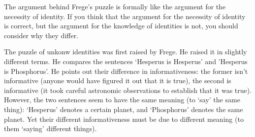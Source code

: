 \documentclass[../../../include/open-logic-chapter]{subfiles}
\begin{document}
The argument behind Frege's puzzle is formally like the argument 
for the necessity of identity. If you think that the argument for 
the necessity of identity is correct, but the argument for 
the knowledge of identities is not, you should consider why
they differ.

The puzzle of unkonw identities was first raised by Frege. He raised
it in slightly different terms. He compares the sentences `Hesperus is
Hesperus' and 'Hesperus is Phosphorus'. He points out their difference
in informativeness: the former isn't informative (anyone would have
figured it out that it is true), the second is informative (it took
careful astronomic observations to establish that it was true).
However, the two sentences seem to have the same meaning (to `say' the
same thing): `Hesperus' denotes a certain planet, and `Phosphorus'
denotes the same planet. Yet their different informativeness must be
due to different meaning (to them `saying' different things). 

\end{document}
